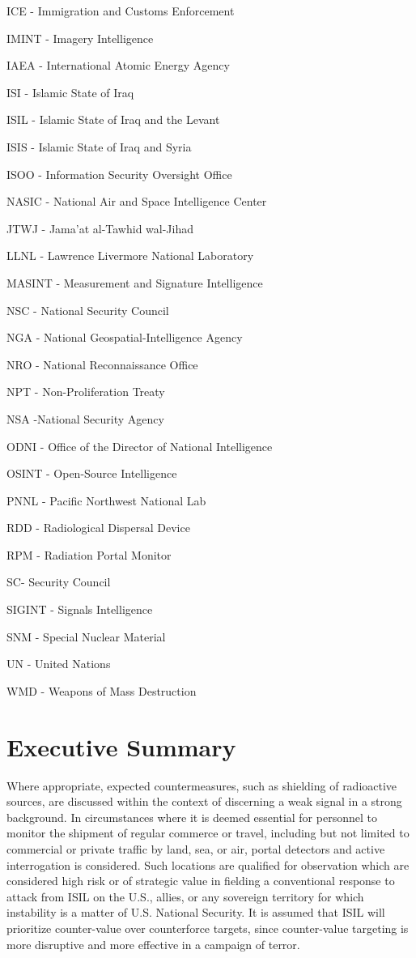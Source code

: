 \documentclass{report}
\begin{document}
ICE - Immigration and Customs Enforcement

IMINT - Imagery Intelligence 

IAEA - International Atomic Energy Agency 

ISI - Islamic State of Iraq

ISIL - Islamic State of Iraq and the Levant

ISIS - Islamic State of Iraq and Syria

ISOO - Information Security Oversight Office

NASIC - National Air and Space Intelligence Center 

JTWJ - Jama'at al-Tawhid wal-Jihad 

LLNL - Lawrence Livermore National Laboratory

MASINT - Measurement and Signature Intelligence 

NSC - National Security Council  

NGA - National Geospatial-Intelligence Agency 

NRO - National Reconnaissance Office

NPT - Non-Proliferation Treaty

NSA -National Security Agency

ODNI - Office of the Director of National Intelligence

OSINT - Open-Source Intelligence

PNNL - Pacific Northwest National Lab

RDD - Radiological Dispersal Device

RPM - Radiation Portal Monitor

SC- Security Council

SIGINT - Signals Intelligence 

SNM - Special Nuclear Material

UN - United Nations

WMD - Weapons of Mass Destruction

\newpage

\pagestyle{fancy2}


\chapter{Executive Summary}

Where appropriate, expected countermeasures, such as shielding of radioactive sources, are discussed within the context of discerning a weak signal in a strong background. In circumstances where it is deemed essential for personnel to monitor the shipment of regular commerce or travel, including but not limited to commercial or private traffic by land, sea, or air, portal detectors and active interrogation is considered. Such locations are qualified for observation which are considered high risk or of strategic value in fielding a conventional response to attack from ISIL on the U.S., allies, or any sovereign territory for which instability is a matter of U.S. National Security. It is assumed that ISIL will prioritize counter-value over counterforce targets, since counter-value targeting is more disruptive and more effective in a campaign of terror.
\end{document}
